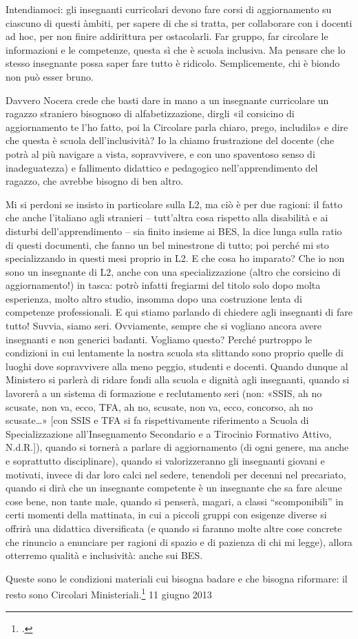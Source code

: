 Intendiamoci: gli insegnanti curricolari devono fare corsi di aggiornamento su ciascuno di questi àmbiti, per sapere di che si tratta, per collaborare con i docenti ad hoc, per non finire addirittura per ostacolarli. Far gruppo, far circolare le informazioni e le competenze, questa sì che è scuola inclusiva. Ma pensare che lo stesso insegnante possa saper fare tutto è ridicolo. Semplicemente, chi è biondo non può esser bruno.

Davvero Nocera crede che basti dare in mano a un insegnante curricolare un ragazzo straniero bisognoso di alfabetizzazione, dirgli «il corsicino di aggiornamento te l'ho fatto, poi la Circolare parla chiaro, prego, includilo» e dire che questa è scuola dell'inclusività? Io la chiamo frustrazione del docente (che potrà al più navigare a vista, sopravvivere, e con uno spaventoso senso di inadeguatezza) e fallimento didattico e pedagogico nell'apprendimento del ragazzo, che avrebbe bisogno di ben altro.

Mi si perdoni se insisto in particolare sulla L2, ma ciò è per due ragioni: il fatto che anche l'italiano agli stranieri – tutt'altra cosa rispetto alla disabilità e ai disturbi dell'apprendimento – sia finito insieme ai BES, la dice lunga sulla ratio di questi documenti, che fanno un bel minestrone di tutto; poi perché mi sto specializzando in questi mesi proprio in L2. E che cosa ho imparato? Che io non sono un insegnante di L2, anche con una specializzazione (altro che corsicino di aggiornamento!) in tasca: potrò infatti fregiarmi del titolo solo dopo molta esperienza, molto altro studio, insomma dopo una costruzione lenta di competenze professionali. E qui stiamo parlando di chiedere agli insegnanti di fare tutto! Suvvia, siamo seri. Ovviamente, sempre che si vogliano ancora avere insegnanti e non generici badanti. Vogliamo questo? Perché purtroppo le condizioni in cui lentamente la nostra scuola sta slittando sono proprio quelle di luoghi dove sopravvivere alla meno peggio, studenti e docenti.
Quando dunque al Ministero si parlerà di ridare fondi alla scuola e dignità agli insegnanti, quando si lavorerà a un sistema di formazione e reclutamento seri (non: «SSIS, ah no scusate, non va, ecco, TFA, ah no, scusate, non va, ecco, concorso, ah no scusate…» [con SSIS e TFA si fa  rispettivamente riferimento a Scuola di Specializzazione all'Insegnamento Secondario e a Tirocinio Formativo Attivo, N.d.R.]), quando si tornerà a parlare di aggiornamento (di ogni genere, ma anche e soprattutto disciplinare), quando si valorizzeranno gli insegnanti giovani e motivati, invece di dar loro calci nel sedere, tenendoli per decenni nel precariato, quando si dirà che un insegnante competente è un insegnante che sa fare alcune cose bene, non tante male, quando si penserà, magari, a classi “scomponibili” in certi momenti della mattinata, in cui a piccoli gruppi con esigenze diverse si offrirà una didattica diversificata (e quando si faranno molte altre cose concrete che rinuncio a enunciare per ragioni di spazio e di pazienza di chi mi legge), allora otterremo qualità e inclusività: anche sui BES.

Queste sono le condizioni materiali cui bisogna badare e che bisogna riformare: il resto sono Circolari Ministeriali.\footcite{LoVetere1}
11 giugno 2013
